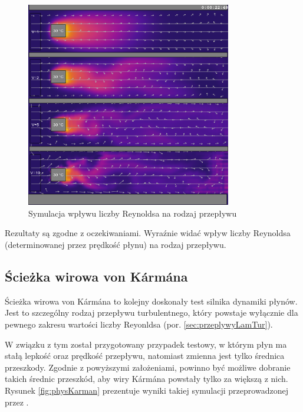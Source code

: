 \begin{figure}[!h]
\centering
\includegraphics[width=0.8\textwidth]{img/physics/laminarTurbulent}
\caption{Symulacja wpływu liczby Reynoldsa na rodzaj przepływu}
\label{fig:physLaminarTurbulent}
\end{figure}

Rezultaty są zgodne z oczekiwaniami. Wyraźnie widać wpływ liczby Reynoldsa
(determinowanej przez prędkość płynu) na rodzaj przepływu.

\subsection{Ścieżka wirowa von Kármána}

Ścieżka wirowa von Kármána to kolejny doskonały test silnika dynamiki płynów.
Jest to szczególny rodzaj przepływu turbulentnego, który powstaje wyłącznie dla
pewnego zakresu wartości liczby Reyonldsa (por. \ref{sec:przeplywyLamTur}).

W związku z tym został przygotowany przypadek testowy, w którym płyn ma stałą
lepkość oraz prędkość przepływu, natomiast zmienna jest tylko średnica
przeszkody. Zgodnie z powyższymi założeniami, powinno być możliwe dobranie
takich średnic przeszkód, aby wiry Kármána powstały tylko za większą z nich.
Rysunek \ref{fig:physKarman} prezentuje wyniki takiej symulacji przeprowadzonej
przez \en.

